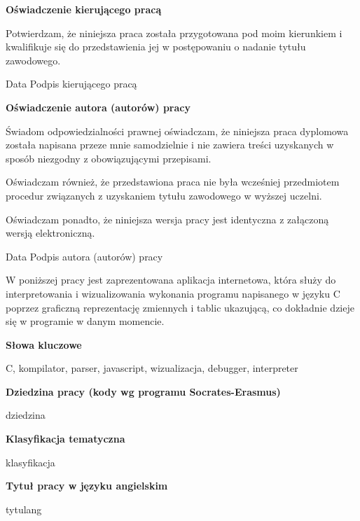 \documentclass[a4paper,twoside,openright,11pt]{report}
\begin{document}
  \begin{titlepage}
    \large
    \null
    \vfill
    
   \textbf{\Large Oświadczenie kierującego pracą }
      \vspace{10mm}
      
   Potwierdzam, że niniejsza praca została przygotowana pod moim 
   kierunkiem i kwalifikuje się do przedstawienia jej w postępowaniu 
   o nadanie tytułu zawodowego. 
   \vspace{15mm}
   
   Data \hfill Podpis kierującego pracą 
   
   \vspace{3cm}
   \textbf{\Large Oświadczenie autora (autorów) pracy}
    \vspace{10mm}
    
   Świadom odpowiedzialności prawnej oświadczam, że niniejsza praca dyplomowa została 
   napisana przeze mnie samodzielnie i nie zawiera treści uzyskanych w sposób niezgodny 
   z obowiązującymi przepisami. 
   
   Oświadczam również, że przedstawiona praca nie była 
   wcześniej przedmiotem procedur związanych z uzyskaniem tytułu zawodowego w wyższej uczelni. 
   
   Oświadczam ponadto, że niniejsza wersja pracy jest identyczna z załączoną wersją elektroniczną. 
   \vspace{15mm}
   
   Data \hfill Podpis autora (autorów) pracy
    \vspace{4cm}
  \end{titlepage}

  \begin{titlepage}
  \null\nobreak\vfil
  \begin{center}%
    \bfseries\large \abstractname
  \end{center}
W poniższej pracy jest zaprezentowana aplikacja internetowa, która służy do interpretowania i wizualizowania wykonania programu napisanego w języku C  poprzez graficzną reprezentację zmiennych i tablic ukazującą, co dokładnie dzieje się w programie w danym momencie.
  \vspace*{26pt}%
  \begin{center}%
    \bfseries\large Słowa kluczowe
  \end{center}
  C, kompilator, parser, javascript, wizualizacja, debugger, interpreter
  \vspace*{26pt}%
  \begin{center}%
    \bfseries\large Dziedzina pracy (kody wg programu Socrates-Erasmus)
  \end{center}
   dziedzina
  \vspace*{26pt}%
  \begin{center}%
    \bfseries\large Klasyfikacja tematyczna
  \end{center}
  klasyfikacja
  \vspace*{26pt}%
  \begin{center}%
    \bfseries\large Tytuł pracy w języku angielskim
  \end{center}
  tytulang
  \nobreak\vfil\null\cleardoublepage
  \end{titlepage}
\end{document}
